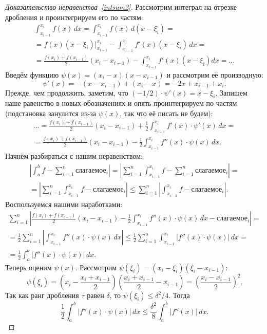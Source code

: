 \begin{proof}[Доказательство неравенства~\eqref{intsum2}]
	Рассмотрим интеграл на отрезке дробления и проинтегрируем его по частям:
	\begin{multline*}
		\int_{x_{i - 1}}^{x_i} f(x) \, dx = \int_{x_{i - 1}}^{x_i} f(x) \, d(x - \xi_i) = \\
		= f(x) (x - \xi_i) \bigg|_{x_{i - 1}}^{x_i} - \int_{x_{i - 1}}^{x_i} f'(x) (x - \xi_i) \, dx = \\
		= \frac{f(x_i) + f(x_{i - 1})}{2} (x_i - x_{i - 1}) - \int_{x_{i - 1}}^{x_i} f'(x) (x - \xi_i) dx = \ldots
	\end{multline*}
	Введём функцию \(\psi(x) = (x_i - x) (x - x_{i - 1})\) и рассмотрим её производную: \[
		\psi'(x) = -(x - x_{i - 1}) + (x_i - x) = -2x + x_{i - 1} + x_i.
		\]
		Прежде, чем продолжить, заметим, что \((-1/2) \cdot \psi'(x) = x - \xi_i\). Запишем наше равенство в новых обозначениях и опять проинтегрируем по частям (подстановка занулится из-за \(\psi(x)\), так что её писать не будем):
	\begin{multline*}
		\ldots = \frac{f(x_i) + f(x_{i - 1})}{2} (x_i - x_{i - 1}) + \frac{1}{2} \int_{x_{i - 1}}^{x_i} f'(x) \cdot \psi'(x) \, dx = \\
		= \frac{f(x_i) + f(x_{i - 1})}{2} (x_i - x_{i - 1}) - \frac{1}{2}\int_{x_{i - 1}}^{x_i} f''(x) \cdot \psi(x) \, dx.
	\end{multline*} 
	Начнём разбираться с нашим неравенством:
	\begin{multline*}
		\left|\int_a^b f - \sum_{i = 1}^n \textit{слагаемое}_i \right| = \left|\sum_{i = 1}^n \int_{x_{i - 1}}^{x_i} f - \sum_{i = 1}^n \textit{слагаемое}_i \right| = \\
		= \left|\sum_{i = 1}^n \int_{x_{i - 1}}^{x_i} f - \textit{слагаемое}_i \right| \leqslant \sum_{i = 1}^n \left|\int_{x_{i - 1}}^{x_i} f - \textit{слагаемое}_i \right|.
	\end{multline*}
	Воспользуемся нашими наработками:
	\begin{multline*}
		\sum_{i = 1}^n \left|\frac{f(x_i) + f(x_{i - 1})}{2} (x_i - x_{i - 1}) - \frac{1}{2}\int_{x_{i - 1}}^{x_i} f''(x) \cdot \psi(x) \, dx - \textit{слагаемое}_i \right| = \\
		= \frac{1}{2} \sum_{i = 1}^n \left|\int_{x_{i - 1}}^{x_i} f''(x) \cdot \psi(x) \, dx \right| \leqslant \frac{1}{2} \sum_{i = 1}^n \int_{x_{i - 1}}^{x_i} \left|f''(x) \cdot \psi(x) \right| \, dx = \\
		= \frac{1}{2} \int_a^b \left|f''(x) \cdot \psi(x) \right| \, dx.
	\end{multline*}
	Теперь оценим \(\psi(x)\). Рассмотрим \(\psi(\xi_i) = (x_i - \xi_i) (\xi_i - x_{i - 1})\): \[
	\psi(\xi_i) = \left(x_i - \frac{x_i + x_{i - 1}}{2} \right) \left(\frac{x_i + x_{i - 1}}{2} - x_{i - 1}\right) = \left(\frac{x_i - x_{i - 1}}{2} \right)^2.
	\]
	Так как ранг дробления \(\tau\) равен \(\delta\), то \(\psi(\xi_i) \leqslant \delta^2 /4\).
	Тогда \[
	\frac{1}{2} \int_a^b \left|f''(x) \cdot \psi(x) \right| \, dx \leqslant \frac{\delta^2}{8} \int_a^b \left|f''(x) \right| \, dx.
	\]
\end{proof}

